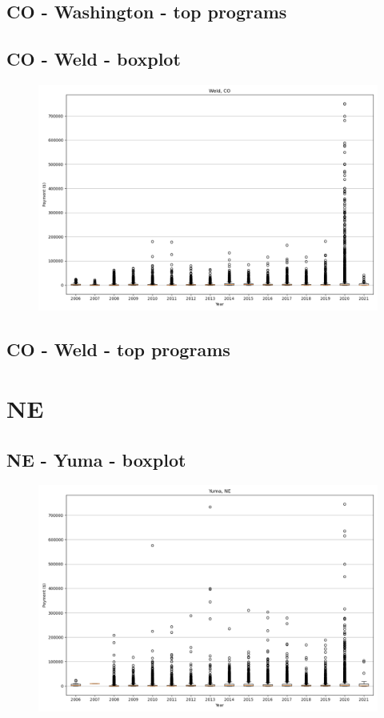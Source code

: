 \subsection*{CO - Washington - top programs}

\newpage
\subsection*{CO - Weld - boxplot}
\begin{figure}[h]
\centering
\includegraphics[width=7in]{../output/boxplots/counties/Weld-CO_boxplot.png}
\end{figure}


\subsection*{CO - Weld - top programs}

\newpage
\section*{NE}
\subsection*{NE - Yuma - boxplot}
\begin{figure}[h]
\centering
\includegraphics[width=7in]{../output/boxplots/counties/Yuma-NE_boxplot.png}
\end{figure}


